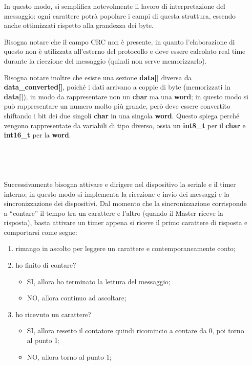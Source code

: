 \documentclass[a4paper,titlepage]{book}
\begin{document}
In questo modo, si semplifica notevolmente il lavoro di interpretazione del messaggio: ogni carattere potrà popolare i campi di questa struttura, essendo anche ottimizzati rispetto alla grandezza dei byte. 

Bisogna notare che il campo CRC non è presente, in quanto l'elaborazione di questo non è utilizzata all'esterno del protocollo e deve essere calcolato real time durante la ricezione del messaggio (quindi non serve memorizzarlo).

Bisogna notare inoltre che esiste una sezione \textbf{data[]} diversa da \textbf{data\_converted[]}, poiché i dati arrivano a coppie di byte (memorizzati in \textbf{data[]}), in modo da rappresentare non un \textbf{char} ma una \textbf{word}; in questo modo si può rappresentare un numero molto più grande, però deve essere convertito shiftando i bit dei due singoli \textbf{char} in una singola \textbf{word}. Questo spiega perché vengono rappresentate da variabili di tipo diverso, ossia un \textbf{int8\_t} per il \textbf{char} e \textbf{int16\_t} per la \textbf{word}.

~

~

Successivamente bisogna attivare e dirigere nel dispositivo la seriale e il timer interno; in questo modo si implementa la ricezione e invio dei messaggi e la sincronizzazione dei dispositivi. Dal momento che la sincronizzazione corrisponde a ``contare'' il tempo tra un carattere e l'altro (quando il Master riceve la risposta), basta attivare un timer appena si riceve il primo carattere di risposta e comportarsi come segue:

\begin{enumerate}[noitemsep,topsep=15pt,parsep=6pt,partopsep=0pt]

\item rimango in ascolto per leggere un carattere e contemporaneamente conto;
\item ho finito di contare?
	\begin{itemize}
	\item SI, allora ho terminato la lettura del messaggio;
	\item NO, allora continuo ad ascoltare;
	\end{itemize}
\item ho ricevuto un carattere?
	\begin{itemize}
	\item SI, allora resetto il contatore quindi ricomincio a contare da 0, poi torno al punto 1;
	\item NO, allora torno al punto 1;
	\end{itemize}

\end{enumerate}
\end{document}
